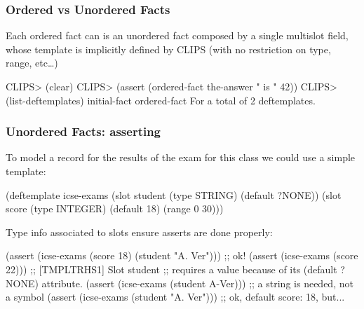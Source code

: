 \documentclass[xcolor={usenames,dvipsnames,svgnames}, compress]{beamer}
\begin{document}
\begin{frame}[fragile]
  \frametitle{Ordered vs Unordered Facts}
  Each ordered fact can is an unordered fact composed by a single
  multislot field, whose template is implicitly defined by CLIPS (with
  no restriction on type, range, etc\dots)
  \begin{clips-code}
    CLIPS> (clear)
    CLIPS> (assert (ordered-fact the-answer " is "  42))
    CLIPS> (list-deftemplates)
    initial-fact
    ordered-fact
    For a total of 2 deftemplates.
  \end{clips-code}
\end{frame}

\begin{frame}[fragile]
  \frametitle{Unordered Facts: asserting}
  To model a record for the results of the exam for this class we
  could use a simple template:
  \begin{clips-code}[numbers=none]
    (deftemplate icse-exams
        (slot student
            (type STRING)
            (default ?NONE))
        (slot score
            (type INTEGER)
            (default 18)
            (range 0 30)))
  \end{clips-code}
  
  Type info associated to slots ensure asserts are done properly:
  \begin{clips-code}[numbers=none]
    (assert (icse-exams (score 18) (student "A. Ver"))) ;; ok!
    (assert (icse-exams (score 22))) ;; [TMPLTRHS1] Slot student
    ;; requires a value because of its (default ?NONE) attribute.
    (assert (icse-exams (student A-Ver))) ;; a string is needed, not a symbol
    (assert (icse-exams (student "A. Ver"))) ;; ok, default score: 18, but...
  \end{clips-code}
  
\end{frame}
\end{document}
